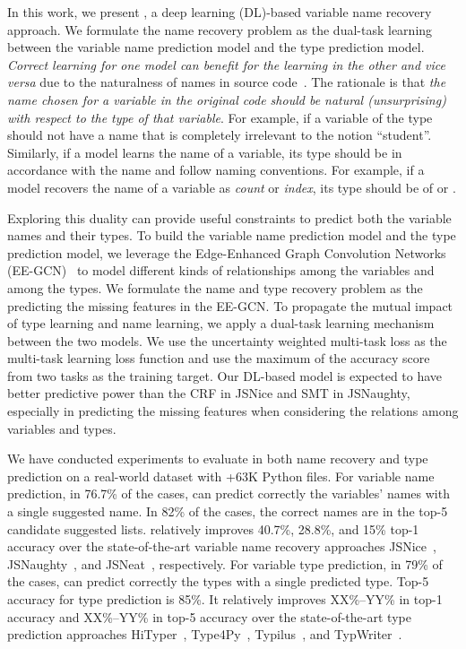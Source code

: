 


In this work, we present {\tool}, a deep learning (DL)-based variable
name recovery approach. We formulate the name recovery problem as the
dual-task learning between the variable name prediction model and the
type prediction model. {\em Correct learning for one model can benefit
  for the learning in the other and vice versa} due to the naturalness
of names in source code~\cite{hindle-icse12}. The rationale is that
{\em the name chosen for a variable in the original code should be
  natural (unsurprising) with respect to the type of that
  variable}. For example, if a variable of the type 
should not have a name that is completely irrelevant to the notion
``student''. Similarly, if a model learns the name of a variable, its
type should be in accordance with the name and follow naming
conventions. For example, if a model recovers the name of a variable
as {\em count} or {\em index}, its type should be of  or
.

Exploring this duality can provide useful constraints to predict both
the variable names and their types.  To build the variable name
prediction model and the type prediction model, we leverage the
Edge-Enhanced Graph Convolution Networks (EE-GCN)~\cite{ee-gcn} to
model different kinds of relationships among the variables and among
the types. We formulate the name and type recovery problem as the
predicting the missing features in the EE-GCN. To propagate the mutual
impact of type learning and name learning, we apply a dual-task
learning mechanism between the two models. We use the uncertainty
weighted multi-task loss as the multi-task learning loss function and
use the maximum of the accuracy score from two tasks as the training
target. Our DL-based model is expected to have better predictive power
than the CRF in JSNice and SMT in JSNaughty, especially in predicting
the missing features when considering the relations among variables
and types.

We have conducted experiments to evaluate {\tool} in both name
recovery and type prediction on a real-world dataset with +63K Python
files. For variable name prediction, in 76.7\% of the cases, {\tool}
can predict correctly the variables' names with a single suggested
name. In 82\% of the cases, the correct names are in the top-5
candidate suggested lists. {\tool} relatively improves 40.7\%, 28.8\%,
and 15\% top-1 accuracy over the state-of-the-art variable name
recovery approaches JSNice~\cite{JSNice2015},
JSNaughty~\cite{JSNaughty2017}, and JSNeat~\cite{icse19},
respectively. For variable type prediction, in 79\% of the cases,
{\tool} can predict correctly the types with a single predicted type.
Top-5 accuracy for type prediction is 85\%. It relatively improves
XX\%--YY\% in top-1 accuracy and XX\%--YY\% in top-5 accuracy over the
state-of-the-art type prediction approaches HiTyper~\cite{yi},
Type4Py~\cite{yi}, Typilus~\cite{yi}, and TypWriter~\cite{yi}.

